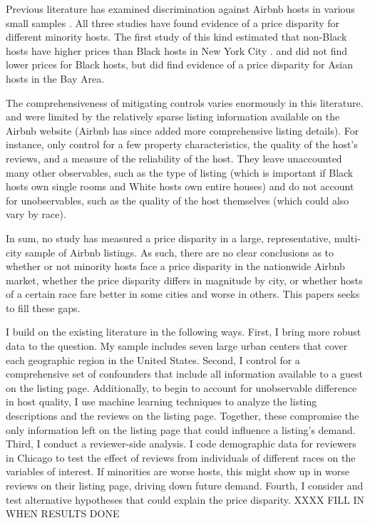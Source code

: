 Previous literature has examined discrimination against Airbnb hosts in various small samples \citep{edelman, wang, kakar}. All three studies have found evidence of a price disparity for different minority hosts. The first study of this kind estimated that non-Black hosts have higher prices than Black hosts in New York City \citep{edelman}. \cite{wang} and \cite{kakar} did not find lower prices for Black hosts, but did find evidence of a price disparity for Asian hosts in the Bay Area. 

The comprehensiveness of mitigating controls varies enormously in this literature. \cite{wang} and \cite{edelman} were limited by the relatively sparse listing information available on the Airbnb website (Airbnb has since added more comprehensive listing details). For instance, \cite{edelman} only control for a few property characteristics, the quality of the host's reviews, and a measure of the reliability of the host. They leave unaccounted many other observables, such as the type of listing (which is important if Black hosts own single rooms and White hosts own entire houses) and do not account for unobservables, such as the quality of the host themselves (which could also vary by race).

In sum, no study has measured a price disparity in a large, representative, multi-city sample of Airbnb listings. As such, there are no clear conclusions as to whether or not minority hosts face a price disparity in the nationwide Airbnb market, whether the price disparity differs in magnitude by city, or whether hosts of a certain race fare better in some cities and worse in others. This papers seeks to fill these gaps. 

I build on the existing literature in the following ways. First, I bring more robust data to the question. My sample includes seven large urban centers that cover each geographic region in the United States. Second, I control for a comprehensive set of confounders that include all information available to a guest on the listing page. Additionally, to begin to account for unobservable difference in host quality, I use machine learning techniques to analyze the listing descriptions and the reviews on the listing page. Together, these compromise the only information left on the listing page that could influence a listing's demand. Third, I conduct a reviewer-side analysis. I code demographic data for reviewers in Chicago to test the effect of reviews from individuals of different races on the variables of interest. If minorities are worse hosts, this might show up in worse reviews on their listing page, driving down future demand. Fourth, I consider and test alternative hypotheses that could explain the price disparity. XXXX FILL IN WHEN RESULTS DONE 


